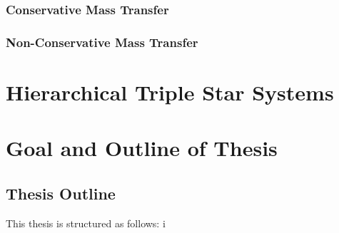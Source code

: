 \subsubsection{Conservative Mass Transfer}

\subsubsection{Non-Conservative Mass Transfer}


\section{Hierarchical Triple Star Systems}


\section{Goal and Outline of Thesis}


\subsection{Thesis Outline}
This thesis is structured as follows: i